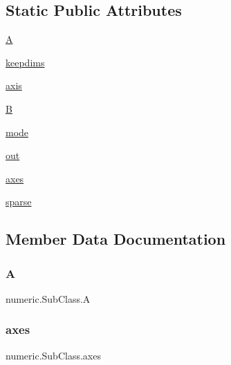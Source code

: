 \subsection*{Static Public Attributes}
\begin{DoxyCompactItemize}
\item 
\hyperlink{classnumeric_1_1SubClass_af38fb498b141027e72381e46deeb3ca6}{A}
\item 
\hyperlink{classnumeric_1_1SubClass_a3d40ede8ab1f3266b3e432531aa71b28}{keepdims}
\item 
\hyperlink{classnumeric_1_1SubClass_aa48c5418d2fe6c2b8d16088aa9b87790}{axis}
\item 
\hyperlink{classnumeric_1_1SubClass_a2272c4d6f9f8c707e6a18023310ca8f4}{B}
\item 
\hyperlink{classnumeric_1_1SubClass_a742f283a12fcd562365ff552c0d7dcc5}{mode}
\item 
\hyperlink{classnumeric_1_1SubClass_a72faef303b82a697ddb7a5f6239a0931}{out}
\item 
\hyperlink{classnumeric_1_1SubClass_a0bfd9cc784513ed009e6bd1e76a40be8}{axes}
\item 
\hyperlink{classnumeric_1_1SubClass_a015b8a308007b01c9bcb3a4e6d47877f}{sparse}
\end{DoxyCompactItemize}


\subsection{Member Data Documentation}
\mbox{\label{classnumeric_1_1SubClass_af38fb498b141027e72381e46deeb3ca6}} 
\subsubsection{\texorpdfstring{A}{A}}
{\footnotesize\ttfamily numeric.\+Sub\+Class.\+A\hspace{0.3cm}{\ttfamily [static]}}

\mbox{\label{classnumeric_1_1SubClass_a0bfd9cc784513ed009e6bd1e76a40be8}} 
\subsubsection{\texorpdfstring{axes}{axes}}
{\footnotesize\ttfamily numeric.\+Sub\+Class.\+axes\hspace{0.3cm}{\ttfamily [static]}}


